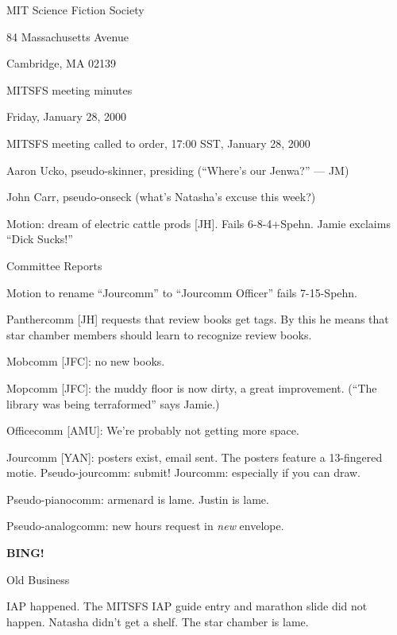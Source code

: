 \documentclass[12pt]{article}
\begin{document}
\begin{center}

MIT Science Fiction Society 

84 Massachusetts Avenue

Cambridge, MA 02139

\vspace{12pt}

MITSFS meeting minutes

Friday, January 28, 2000

\end{center}

\vskip 12pt

MITSFS meeting called to order, 17:00 SST, January 28, 2000

Aaron Ucko, pseudo-skinner, presiding (``Where's our Jenwa?'' --- JM)

John Carr, pseudo-onseck (what's Natasha's excuse this week?)

\vskip 12pt

Motion: dream of electric cattle prods [JH].  Fails \hbox{6-8-4+Spehn}.
Jamie exclaims ``Dick Sucks!''

\vskip 12pt

\centerline{Committee Reports}

Motion to rename ``Jourcomm'' to ``Jourcomm Officer'' fails \hbox{7-15-Spehn}.

Panthercomm [JH] requests that review books get tags.  By this he means that
star chamber members should learn to recognize review books.

Mobcomm [JFC]: no new books.

Mopcomm [JFC]: the muddy floor is now dirty, a great improvement.
(``The library was being terraformed'' says Jamie.)

Officecomm [AMU]: We're probably not getting more space.

Jourcomm [YAN]: posters exist, email sent.
The posters feature a 13-fingered motie.
Pseudo-jourcomm: submit!
Jourcomm: especially if you can draw.

Pseudo-pianocomm: armenard is lame.  Justin is lame.

Pseudo-analogcomm: new hours request in {\it new} envelope.

{\bf BING!}

\vskip 12pt

\centerline{Old Business}

IAP happened.  The MITSFS IAP guide entry and marathon slide did not happen.
Natasha didn't get a shelf.  The star chamber is lame.
\end{document}
